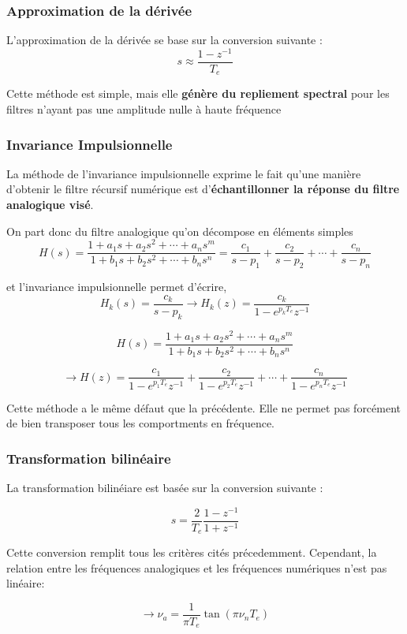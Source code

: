 \documentclass[11pt,a4paper]{article}
\begin{document}
\subsubsection{Approximation de la dérivée}
L'approximation de la dérivée se base sur la conversion suivante :
\[\boxed{s  \approx \frac{1-z^{-1}}{T_e}} \]

Cette méthode est simple, mais elle \textbf{génère du repliement spectral} pour les filtres n'ayant pas une amplitude nulle à haute fréquence
\subsubsection{Invariance Impulsionnelle}
La méthode de l'invariance impulsionnelle exprime le fait qu'une manière d'obtenir le filtre récursif numérique est d'\textbf{échantillonner la réponse du filtre analogique visé}.

On part donc du filtre analogique qu'on décompose en éléments simples
\[ H(s)  =  \frac{1+ a_1 s + a_2 s^2 + \cdots + a_n s^m }{1+ b_1 s + b_2 s^2 + \cdots + b_n s^n} = \frac{c_1}{s-p_1} + \frac{c_2}{s-p_2} + \cdots + \frac{c_n}{s-p_n} \]

et l'invariance impulsionnelle permet d'écrire,
\[ H_k(s) = \frac{c_k}{s-p_k} \rightarrow H_k(z)= \frac{c_k}{1-e^{p_k T_e}z^{-1}}\]

\[ H(s) = \frac{1+ a_1 s + a_2 s^2 + \cdots + a_n s^m }{1+ b_1 s + b_2 s^2 + \cdots + b_n s^n}  \] 

\[ \boxed{\rightarrow H(z) = \frac{c_1}{1-e^{p_1 T_e}z^{-1}} + \frac{c_2}{1-e^{p_2 T_e}z^{-1}}  + \cdots + \frac{c_n}{1-e^{p_n T_e}z^{-1}}} \]

Cette méthode a le même défaut que la précédente. Elle ne permet pas forcément de bien transposer tous les comportments en fréquence.

\subsubsection{Transformation bilinéaire}
La transformation bilinéiare est basée sur la conversion suivante :

\[ \boxed{ s = \frac{2}{T_e} \frac{1-z^{-1}}{1+z^{-1}}} \]

Cette conversion remplit tous les critères cités précedemment. Cependant, la relation entre les fréquences analogiques et les fréquences numériques n'est pas linéaire: 

\[ \rightarrow \nu_a = \frac{1}{ \pi T_e} \tan(\pi \nu_n T_e)\]
\end{document}
